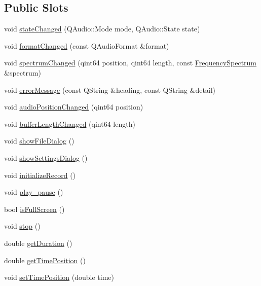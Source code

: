 \subsection*{Public Slots}
\begin{DoxyCompactItemize}
\item 
void \hyperlink{class_main_widget_a8d981512811804749379b2d239e38e55}{state\+Changed} (Q\+Audio\+::\+Mode mode, Q\+Audio\+::\+State state)
\item 
void \hyperlink{class_main_widget_ab380a0a8574e1054dd6bcfd27fc903ec}{format\+Changed} (const Q\+Audio\+Format \&format)
\item 
void \hyperlink{class_main_widget_a48e11cd2d77cfd5cd495884d7d02bc56}{spectrum\+Changed} (qint64 position, qint64 length, const \hyperlink{class_frequency_spectrum}{Frequency\+Spectrum} \&spectrum)
\item 
void \hyperlink{class_main_widget_a0172df70874e3df4a32a11f6f4779310}{error\+Message} (const Q\+String \&heading, const Q\+String \&detail)
\item 
void \hyperlink{class_main_widget_ad3f4f2ec0b4354b72e6626eac21abc52}{audio\+Position\+Changed} (qint64 position)
\item 
void \hyperlink{class_main_widget_ac9c894776e1e971fe1c381b5e4b41296}{buffer\+Length\+Changed} (qint64 length)
\item 
void \hyperlink{class_main_widget_a6dd4b8c9d62111904f92ae4cbd3de0ea}{show\+File\+Dialog} ()
\item 
void \hyperlink{class_main_widget_a532dd01044abf04081c575470c89be17}{show\+Settings\+Dialog} ()
\item 
void \hyperlink{class_main_widget_a0f23ec9b7d93ae56e59e5df3e05511d6}{initialize\+Record} ()
\item 
void \hyperlink{class_main_widget_adc6c0a1a15d78df19bce3d04458c27e2}{play\+\_\+pause} ()
\item 
bool \hyperlink{class_main_widget_a4f4031960df956ff84a49af1c6494366}{is\+Full\+Screen} ()
\item 
void \hyperlink{class_main_widget_acc7c201bd760f3e416703569165b94ea}{stop} ()
\item 
double \hyperlink{class_main_widget_a13ebd72ba1fe175cf326525399e891ac}{get\+Duration} ()
\item 
double \hyperlink{class_main_widget_a12f415557fac96812d8d8d502d1f214e}{get\+Time\+Position} ()
\item 
void \hyperlink{class_main_widget_a977bb230bb404db9b34b7c3b2bf412f1}{set\+Time\+Position} (double time)

\end{DoxyCompactItemize}
